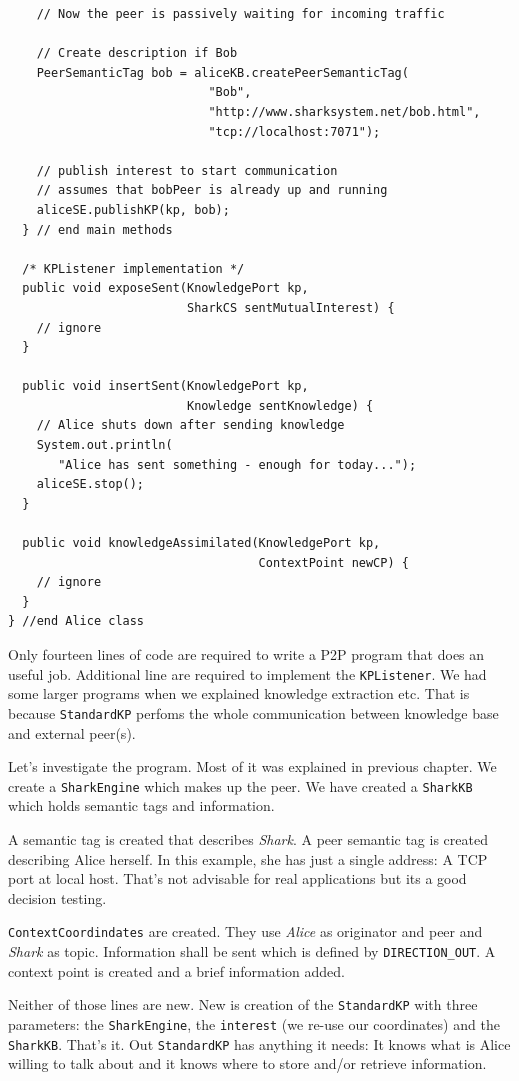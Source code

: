 \begin{verbatim}
    // Now the peer is passively waiting for incoming traffic

    // Create description if Bob
    PeerSemanticTag bob = aliceKB.createPeerSemanticTag(
                            "Bob", 
                            "http://www.sharksystem.net/bob.html", 
                            "tcp://localhost:7071");

    // publish interest to start communication
    // assumes that bobPeer is already up and running
    aliceSE.publishKP(kp, bob);
  } // end main methods

  /* KPListener implementation */
  public void exposeSent(KnowledgePort kp, 
                         SharkCS sentMutualInterest) {
    // ignore
  }

  public void insertSent(KnowledgePort kp, 
                         Knowledge sentKnowledge) {
    // Alice shuts down after sending knowledge
    System.out.println(
       "Alice has sent something - enough for today...");
    aliceSE.stop();
  }

  public void knowledgeAssimilated(KnowledgePort kp, 
                                   ContextPoint newCP) {
    // ignore
  }
} //end Alice class
\end{verbatim}

Only fourteen lines of code are required to write a P2P program that does an useful job. Additional line are required to implement the {\tt KPListener}. We had some larger programs when we explained knowledge extraction etc. That is because {\tt StandardKP} perfoms the whole communication between knowledge base and external peer(s). 

Let's investigate the program. Most of it was explained in previous chapter. We create a {\tt SharkEngine} which makes up the peer. We have created a {\tt SharkKB} which holds semantic tags and information.

A semantic tag is created that describes {\it Shark}. A peer semantic tag is created describing Alice herself. In this example, she has just a single address: A TCP port at local host. That's not advisable for real applications but its a good decision testing.

{\tt ContextCoordindates} are created. They use {\it Alice} as originator and peer and {\it Shark} as topic. Information shall be sent which is defined by 
{\tt DIRECTION\_OUT}. A context point is created and a brief information added.

Neither of those lines are new. New is creation of the {\tt StandardKP} with three parameters: the {\tt SharkEngine}, the {\tt interest} (we re-use our coordinates) and the {\tt SharkKB}. That's it. Out {\tt StandardKP} has anything it needs: It knows what is Alice willing to talk about and it knows where to store and/or retrieve information.

